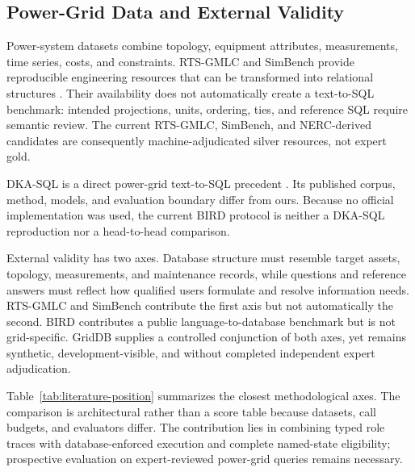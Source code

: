 \documentclass[applsci,article,submit,moreauthors]{Definitions/mdpi}
\begin{document}
\subsection{Power-Grid Data and External Validity}

Power-system datasets combine topology, equipment attributes, measurements, time series, costs, and constraints. RTS-GMLC and SimBench provide reproducible engineering resources that can be transformed into relational structures \cite{barrows2020rts,meinecke2020simbench}. Their availability does not automatically create a text-to-SQL benchmark: intended projections, units, ordering, ties, and reference SQL require semantic review. The current RTS-GMLC, SimBench, and NERC-derived candidates are consequently machine-adjudicated silver resources, not expert gold.

DKA-SQL is a direct power-grid text-to-SQL precedent \cite{bian2025dkasql}. Its published corpus, method, models, and evaluation boundary differ from ours. Because no official implementation was used, the current BIRD protocol is neither a DKA-SQL reproduction nor a head-to-head comparison.

External validity has two axes. Database structure must resemble target assets, topology, measurements, and maintenance records, while questions and reference answers must reflect how qualified users formulate and resolve information needs. RTS-GMLC and SimBench contribute the first axis but not automatically the second. BIRD contributes a public language-to-database benchmark but is not grid-specific. GridDB supplies a controlled conjunction of both axes, yet remains synthetic, development-visible, and without completed independent expert adjudication.

Table~\ref{tab:literature-position} summarizes the closest methodological axes. The comparison is architectural rather than a score table because datasets, call budgets, and evaluators differ. The contribution lies in combining typed role traces with database-enforced execution and complete named-state eligibility; prospective evaluation on expert-reviewed power-grid queries remains necessary.
\end{document}
